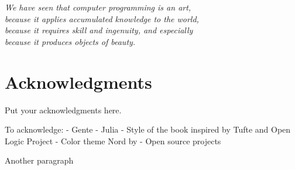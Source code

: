 
\begin{flushright}{\slshape
    We have seen that computer programming is an art, \\
    because it applies accumulated knowledge to the world, \\
    because it requires skill and ingenuity, and especially \\
    because it produces objects of beauty.} \\ \medskip
\end{flushright}



\bigskip

{
    \chapter*{Acknowledgments}
    Put your acknowledgments here.

    To acknowledge:
    - Gente
    - Julia
    - Style of the book inspired by Tufte and Open Logic Project
    - Color theme Nord by
    - Open source projects

    \bigskip

    Another paragraph
}
